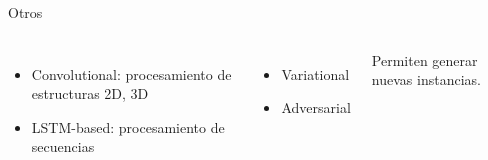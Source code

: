 \begin{frame}{Otros}
\begin{columns}[t]

\begin{itemize}
\item Convolutional: procesamiento de estructuras 2D, 3D
\item LSTM-based: procesamiento de secuencias
\end{itemize}


\begin{itemize}
\item Variational
\item Adversarial
\end{itemize}

Permiten generar nuevas instancias.

\end{columns}
\end{frame}


